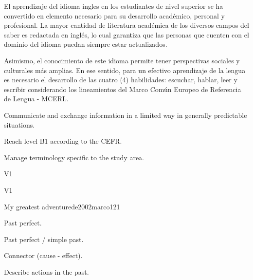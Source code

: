 \begin{syllabus}

\begin{justification}
El aprendizaje del idioma ingles en los estudiantes de nivel superior se ha 
convertido en elemento necesario para su desarrollo académico, personal y 
profesional. La mayor cantidad de literatura académica de los diversos 
campos del saber es redactada en inglés, lo cual garantiza que las personas 
que cuenten con el dominio del idioma puedan siempre estar actualizados. 

Asimismo, el conocimiento de este idioma permite tener perspectivas sociales y 
culturales más amplias. En ese sentido, para un efectivo aprendizaje de la 
lengua es necesario el desarrollo de las cuatro (4) habilidades: 
escuchar, hablar, leer y escribir considerando los lineamientos del 
Marco Común Europeo de Referencia de Lengua - MCERL.
\end{justification}

\begin{goals}
\item Communicate and exchange information in a limited way in generally predictable situations.
\item Reach level B1 according to the CEFR.
\item Manage terminology specific to the study area.
\end{goals}

\begin{outcomes}{V1}
\item {}
\end{outcomes}

\begin{competences}{V1}
    \item {}
\end{competences}

\begin{unit}{My greatest adventure}{de2002marco}{12}{1}
   \begin{topics}
      \item Past perfect.
      \item Past perfect / simple past.
      \item Connector (cause - effect).
   \end{topics}

   \begin{unitgoals}
      \item Describe actions in the past.
   \end{unitgoals}


\end{unit}
\end{syllabus}
